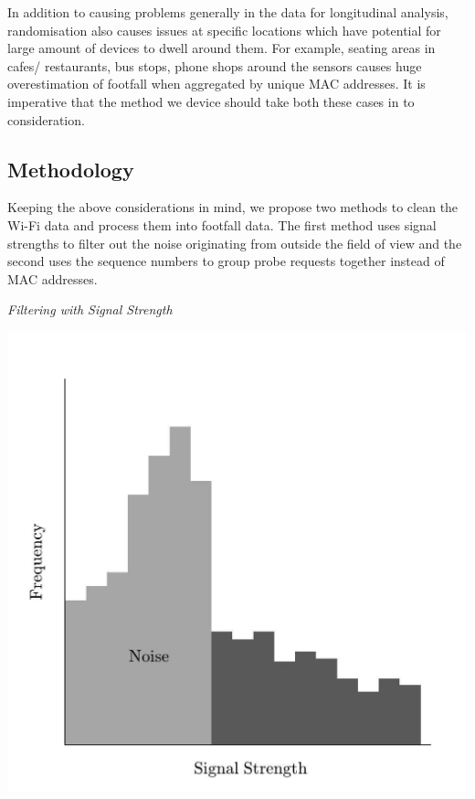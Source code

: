In addition to causing problems generally in the data for longitudinal analysis, randomisation also causes issues at specific locations which have potential for large amount of devices to dwell around them.
For example, seating areas in cafes/ restaurants, bus stops, phone shops around the sensors causes huge overestimation of footfall when aggregated by unique MAC addresses.
It is imperative that the method we device should take both these cases in to consideration.

\subsection{Methodology}
Keeping the above considerations in mind, we propose two methods to clean the Wi-Fi data and process them into footfall data.
The first method uses signal strengths to filter out the noise originating from outside the field of view and the second uses the sequence numbers to group probe requests together instead of MAC addresses.

\vspace{1.5em}\noindent\textit{Filtering with Signal Strength}\vspace{0.5em}

\begin{marginfigure}
  \includegraphics[trim={5 5 5 5},clip]{images/processing-method-signal.jpg}
  \caption{}
  \label{figure:processing:method:signal}
\end{marginfigure}

